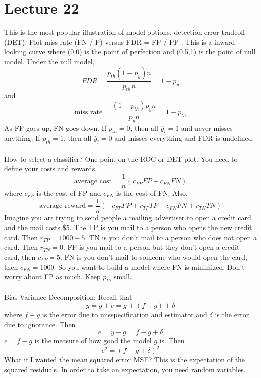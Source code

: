 \documentclass[12pt]{article}
\begin{document}
\section{Lecture 22} 
This is the most popular illustration of model options, detection error tradeoff (DET). Plot miss rate (FN / P) versus FDR = FP / PP . This is a inward looking curve where (0,0) is the point of perfection and (0.5,1) is the point of null model. Under the null model, $$FDR = \frac{p_{th}(1-p_y)n}{p_{th}n} = 1 - p_y $$ and $$\text{miss rate} = \frac{(1-p_{th})p_yn}{p_yn} = 1 - p_{th} $$ As FP goes up, FN goes down. If $p_{th} = 0$, then all $\hat{y}_i = 1$ and never misses anything. If $p_{th} = 1$, then all $\hat{y}_i = 0$ and misses everything and FDR is undefined. \\~\\
How to select a classifier? One point on the ROC or DET plot. You need to define your costs and rewards. 
$$\text{average cost} = \frac{1}{n}(c_{FP}FP + c_{FN}FN) $$ where $c_{FP}$ is the cost of FP and $c_{FN}$ is the cost of FN. Also, $$ \text{average reward} = \frac{1}{n}(-c_{FP}FP + r_{TP}TP - c_{FN}FN + r_{TN}TN) $$ Imagine you are trying to send people a mailing advertiser to open a credit card and the mail costs $\$5$. The TP is you mail to a person who opens the new credit card. Then $r_{TP} = 1000 - 5$. TN is you don't mail to a person who does not open a card. Then $r_{TN} = 0$. FP is you mail to a person but they don't open a credit card, then $c_{FP} = 5$. FN is you don't mail to someone who would open the card, then $c_{FN} = 1000$. So you want to build a model where FN is minimized. Don't worry about FP as much. Keep $p_{th}$ small. \\~\\
Bias-Variance Decomposition: Recall that $$y = g+ e = g+ (f-g) + \delta$$ where $f-g$ is the error due to misspecification and estimator and $\delta$ is the error due to ignorance. Then $$ e = y -g = f-g+\delta$$ $e=f-g$ is the measure of how good the model $g$ is. Then $$e^2 = (f-g+\delta)^2$$ 
What if I wanted the mean squared error MSE? This is the expectation of the squared residuals. In order to take an expectation, you need random variables. \\
\end{document}
